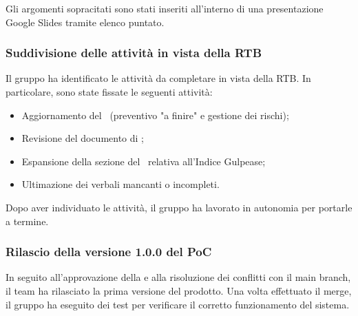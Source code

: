 \vspace{0.5\baselineskip}
\par Gli argomenti sopracitati sono stati inseriti all'interno di una presentazione Google Slides tramite elenco puntato.

\subsubsection{Suddivisione delle attività in vista della RTB}
\par Il gruppo ha identificato le attività da completare in vista della RTB. In particolare, sono state fissate le seguenti attività:
\begin{itemize}
	\item Aggiornamento del \PdP\ (preventivo "a finire" e gestione dei rischi);
	\item Revisione del documento di \AdR;
	\item Espansione della sezione del \PdQ\ relativa all'Indice Gulpease;
	\item Ultimazione dei verbali mancanti o incompleti.
\end{itemize}

\vspace{0.5\baselineskip}
\par Dopo aver individuato le attività, il gruppo ha lavorato in autonomia per portarle a termine.

\subsubsection{Rilascio della versione 1.0.0 del PoC}
\par In seguito all'approvazione della  e alla risoluzione dei conflitti con il main branch, il team ha rilasciato la prima versione del prodotto.
Una volta effettuato il merge, il gruppo ha eseguito dei test per verificare il corretto funzionamento del sistema.
